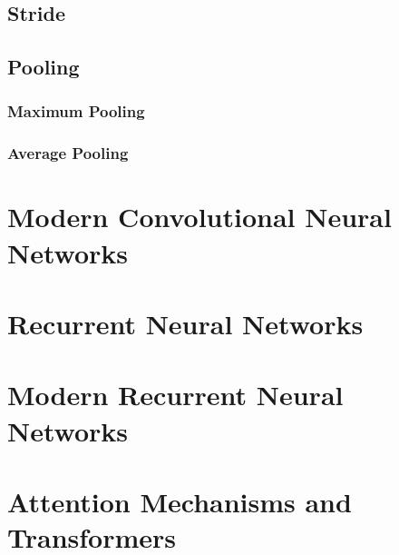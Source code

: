 \documentclass[a4paper,12pt]{article}
\theoremstyle{definition}
\begin{document}
    \subsection*{Stride}

    \subsection*{Pooling}
        \subsubsection*{Maximum Pooling}

        \subsubsection*{Average Pooling}


    \section{Modern Convolutional Neural Networks}

    \section{Recurrent Neural Networks}

    \section{Modern Recurrent Neural Networks}

    \section{Attention Mechanisms and Transformers}
\end{document}
